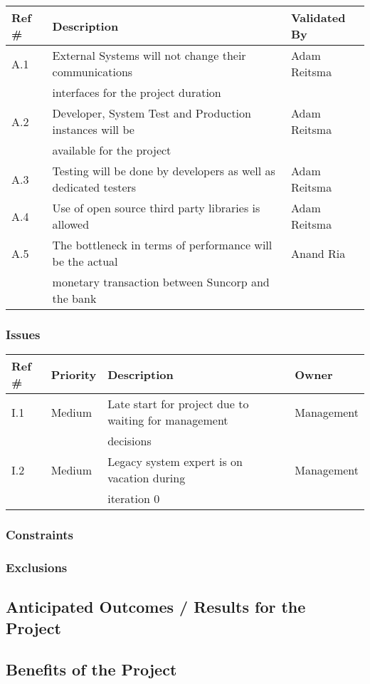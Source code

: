 \begin{tabular}{|l|l|l|}
\hline
{\bf Ref \#} & {\bf Description} & {\bf Validated By} \\
\hline
A.1 & External Systems will not change their communications  \ \  & Adam Reitsma \\  & interfaces for the project duration &  \\
\hline
A.2 & Developer, System Test and Production instances will be & Adam Reitsma \\ & available for the project & \\
\hline
A.3 & Testing will be done by developers as well as dedicated testers & Adam Reitsma \\ 
\hline
A.4 & Use of open source third party libraries is allowed & Adam Reitsma \\
\hline
A.5 & The bottleneck in terms of performance will be the actual   & Anand Ria \\ & monetary transaction between Suncorp and the bank & \\
\hline
\end{tabular}

\subsubsection{Issues}

\begin{tabular}{|l|l|l|l|}
\hline
{\bf Ref \#} & {\bf Priority} & {\bf Description} & {\bf Owner} \\
\hline
I.1 & Medium & Late start for project due to waiting for management  & Management \\ & & decisions & \\
\hline
I.2 & Medium & Legacy system expert is on vacation during  & Management \\ && iteration 0 & \\
\hline
\end{tabular}


\subsubsection{Constraints}


\subsubsection{Exclusions}


\newpage
\subsection{Anticipated Outcomes / Results for the Project}


\subsection{Benefits of the Project}
